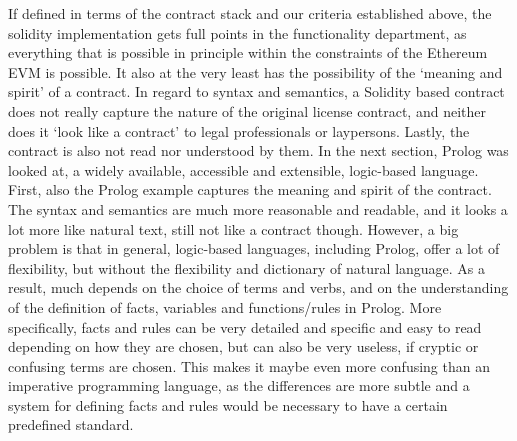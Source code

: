 \documentclass[conference]{IEEEtran}
\begin{document}
If defined in terms of the contract stack and our criteria established above, the solidity implementation gets full points in the functionality department, as everything that is possible in principle within the constraints of the Ethereum EVM is possible. It also at the very least has the possibility of the ‘meaning and spirit’ of a contract.
In regard to syntax and semantics, a Solidity based contract does not really capture the nature of the original license contract, and neither does it ‘look like a contract’ to legal professionals or laypersons. Lastly, the contract is also not read nor understood by them.
In the next section, %
Prolog was looked at, a widely available, accessible and extensible, logic-based language. %
First, also the Prolog example captures the meaning and spirit of the contract. The syntax and semantics are much more reasonable and readable, and it looks a lot more like natural text, still not like a contract though. However, a big problem is that in general, logic-based languages, including Prolog, offer a lot of flexibility, but without the flexibility and dictionary of natural language. As a result, much depends on the choice of terms and verbs, %
and on the understanding of the definition of facts, variables and functions/rules in Prolog. More specifically, facts and rules can be very detailed and specific and easy to read depending on how they are chosen, but can also be very useless, if cryptic or confusing terms are chosen.
This makes it maybe even more confusing than an imperative programming language, as the differences are more subtle and a system for defining facts and rules would be necessary to have a certain predefined standard.
%
\end{document}
